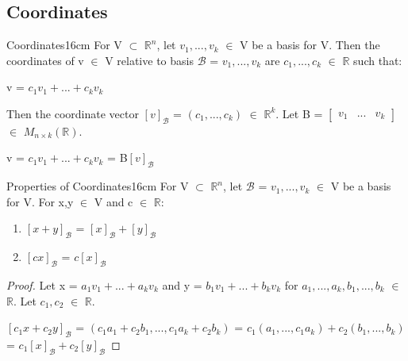     \newpage





\subsection{ Coordinates }

    \begin{definition}{Coordinates}{16cm}
        For V $\subset$ $\mathbb{R}^n$, let $v_1,...,v_k$ $\in$ V be
        a basis for V.
        Then the {\color{lblue} coordinates} of v $\in$ V relative to basis 
        $\mathcal{B}$ = $v_1,...,v_k$ are $c_1,...,c_k$ $\in$ $\mathbb{R}$
        such that:

        \hspace{0.5cm}
        v = $c_1v_1 + ... + c_kv_k$

        Then the {\color{lblue} coordinate vector}
        $[v]_{\mathcal{B}}$ = $(c_1,...,c_k)$ $\in$ $\mathbb{R}^k$.
        Let B =
        $\begin{bmatrix}
            v_1 & ... & v_k
        \end{bmatrix}$ $\in$ $M_{n \times k}(\mathbb{R})$.

        \hspace{0.5cm}
        v = $c_1v_1 + ... + c_kv_k$
        = B$[v]_{\mathcal{B}}$
    \end{definition}

    \vspace{0.5cm}



    \begin{wtheorem}{Properties of Coordinates}{16cm}
        For V $\subset$ $\mathbb{R}^n$, let $\mathcal{B}$ = $v_1,...,v_k$ $\in$ V
        be a basis for V. For x,y $\in$ V and c $\in$ $\mathbb{R}$:

        \begin{enumerate}[label=(\alph*), leftmargin=1cm, itemsep=0.1cm]
            \item $[x+y]_{\mathcal{B}}$ = $[x]_{\mathcal{B}} + [y]_{\mathcal{B}}$
            
            \item $[cx]_{\mathcal{B}}$ = $c[x]_{\mathcal{B}}$
        \end{enumerate}
    \end{wtheorem}

    \begin{proof}
        Let x = $a_1v_1 + ... + a_kv_k$
        and y = $b_1v_1 + ... + b_kv_k$
        for $a_1,...,a_k,b_1,...,b_k$ $\in$ $\mathbb{R}$.
        Let $c_1,c_2$ $\in$ $\mathbb{R}$.

        \hspace{0.5cm}
        $[c_1x+c_2y]_{\mathcal{B}}$
        = $(c_1a_1+c_2b_1,...,c_1a_k+c_2b_k)$
        = $c_1(a_1,...,c_1a_k) + c_2(b_1,...,b_k)$
        = $c_1[x]_{\mathcal{B}} + c_2[y]_{\mathcal{B}}$
    \end{proof}

